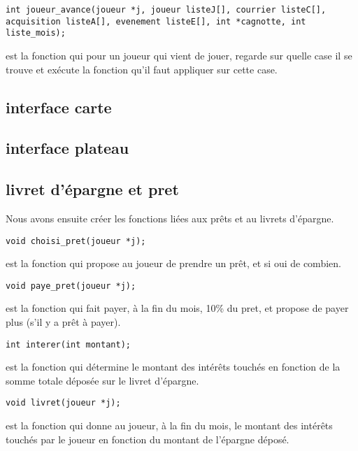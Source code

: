 \documentclass[a4paper, 11pt]{report}
\begin{document}
\begin{verbatim}
int joueur_avance(joueur *j, joueur listeJ[], courrier listeC[], acquisition listeA[], evenement listeE[], int *cagnotte, int liste_mois);
\end{verbatim}
est la fonction qui pour un joueur qui vient de jouer, regarde sur quelle case il se trouve et exécute la fonction qu'il faut appliquer sur cette case.


\subsection{interface carte}









\subsection{interface plateau}









\subsection{livret d'épargne et pret}
Nous avons ensuite créer les fonctions liées aux prêts et au livrets d'épargne.

\begin{verbatim}
void choisi_pret(joueur *j);
\end{verbatim}
est la fonction qui propose au joueur de prendre un prêt, et si oui de combien.

\begin{verbatim}
void paye_pret(joueur *j);
\end{verbatim}
est la fonction qui fait payer, à la fin du mois, 10\% du pret, et propose de payer plus (s'il y a prêt à payer).

\begin{verbatim}
int interer(int montant);
\end{verbatim}
est la fonction qui détermine le montant des intérêts touchés en fonction de la somme totale déposée sur le livret d'épargne.

\begin{verbatim}
void livret(joueur *j);
\end{verbatim}
est la fonction qui donne au joueur, à la fin du mois, le montant des intérêts touchés par le joueur en fonction du montant de l'épargne déposé.
\end{document}
